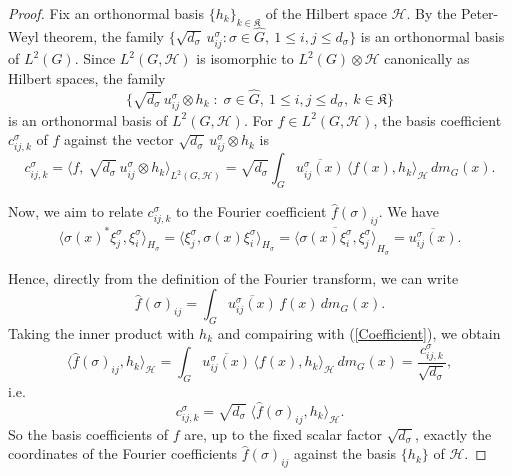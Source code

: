 \documentclass[11pt]{amsart}
\begin{document}
\begin{proof}
Fix an orthonormal basis $\{h_k\}_{k\in \mathfrak{K}}$ of the Hilbert space $\mathcal{H}$. By the Peter-Weyl theorem,  the family $\{\sqrt{d_\sigma}\,u^\sigma_{ij} :
\sigma\in\widehat{G},\ 1\le i,j\le d_\sigma\}$ is an orthonormal basis of $L^2(G)$.  Since
$L^2(G,\mathcal{H})$ is isomorphic to $L^2(G)\otimes\mathcal{H}$ canonically as Hilbert spaces, the family
\[
\big\{\sqrt{d_\sigma}\,u^\sigma_{ij}\otimes h_k \;:\; \sigma\in\widehat{G},\ 1\le i,j\le
d_\sigma,\ k\in \mathfrak{K}\big\}
\]
is an orthonormal basis of $L^2(G,\mathcal{H})$. For $f\in  L^2(G,\mathcal{H})$,  the basis coefficient $c^\sigma_{ij,k}$ of $f$ against the vector $\sqrt{d_\sigma}\,u^\sigma_{ij}\otimes h_k$ is
\begin{equation}\label{Coefficient}
c^\sigma_{ij,k}=\big\langle f,\ \sqrt{d_\sigma}\,u^\sigma_{ij}\otimes h_k
\big\rangle_{L^2(G,\mathcal{H})}
=\sqrt{d_\sigma}\int_G \overline{u^\sigma_{ij}(x)}\,\big\langle f(x),h_k\big\rangle_\mathcal{H}
\,dm_G(x).
\end{equation}

Now, we aim to  relate $c^\sigma_{ij,k}$ to the Fourier coefficient $\widehat{f}(\sigma)_{ij}$.
We have
\[
\big\langle\sigma(x)^*\xi_j^\sigma,\xi_i^\sigma\big\rangle_{H_\sigma}
=\big\langle\xi_j^\sigma,\sigma(x)\xi_i^\sigma\big\rangle_{H_\sigma}
=\overline{\big\langle\sigma(x)\xi_i^\sigma,\xi_j^\sigma\big\rangle}_{H_\sigma}
=\overline{u^\sigma_{ij}(x)}.
\]

Hence, directly from the definition of the Fourier transform, we can write 
\[
\widehat f(\sigma)_{ij}
=\int_G\overline{u^\sigma_{ij}(x)}\,f(x)\,dm_G(x).
\]
Taking the inner product with $h_k$ and compairing with (\ref{Coefficient}), we obtain 
\[
\big\langle\widehat f(\sigma)_{ij},h_k\big\rangle_\mathcal{H}
=\int_G\overline{u^\sigma_{ij}(x)}\,\big\langle f(x),h_k\big\rangle_\mathcal{H}\,dm_G(x)
=\frac{c^\sigma_{ij,k}}{\sqrt{d_\sigma}},
\]
i.e.
\begin{equation}\label{CoefficientC}
c^\sigma_{ij,k}=\sqrt{d_\sigma}\;\big\langle \widehat f(\sigma)_{ij},h_k\big\rangle_\mathcal{H}.
\end{equation}
So the basis coefficients of $f$ are, up to the fixed scalar factor $\sqrt{d_\sigma}$,
exactly the coordinates of the Fourier coefficients $\widehat f(\sigma)_{ij}$ against the basis $\{h_k\}$ of $\mathcal{H}$.


\end{proof}
\end{document}
